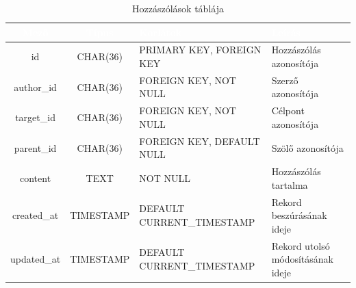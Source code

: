 \documentclass[12pt]{report}
\begin{document}
\begin{table}[h!]
    \centering
    \renewcommand{\arraystretch}{1.5}  %
    \begin{tabularx}{\textwidth}{|c|c|>{\raggedright\arraybackslash}X|>{\raggedright\arraybackslash}X|}  %
        \hline
        \rowcolor{gray!30} \textcolor{white}{\textbf{Mező}} & \textcolor{white}{\textbf{Típus}} & \textcolor{white}{\textbf{Korlátok}} & \textcolor{white}{\textbf{Leírás}} \\
        \hline
        id & CHAR(36) & PRIMARY KEY, FOREIGN KEY & Hozzászólás azonosítója \\
        \hline
        author\_id & CHAR(36) & FOREIGN KEY, NOT NULL & Szerző azonosítója \\
        \hline
        target\_id & CHAR(36) & FOREIGN KEY, NOT NULL & Célpont azonosítója \\
        \hline
        parent\_id & CHAR(36) & FOREIGN KEY, DEFAULT NULL & Szölő azonosítója \\
        \hline
        content & TEXT & NOT NULL & Hozzászólás tartalma \\
        \hline
        created\_at & TIMESTAMP & DEFAULT CURRENT\_TIMESTAMP & Rekord beszúrásának ideje \\
        \hline
        updated\_at & TIMESTAMP & DEFAULT CURRENT\_TIMESTAMP & Rekord utolsó módosításának ideje \\
        \hline
    \end{tabularx}
    \caption{Hozzászólások táblája}
    \label{tab:comments}
\end{table}
\end{document}
